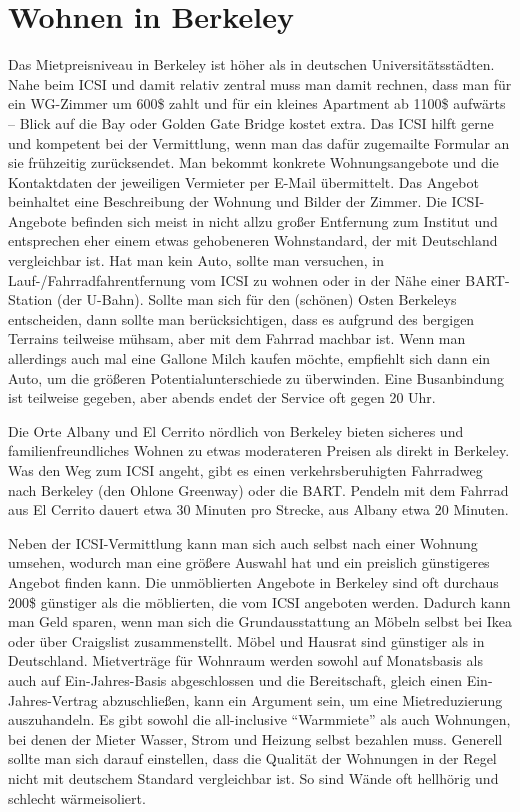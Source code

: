 \documentclass[a4paper]{scrreprt}
\begin{document}
\section{Wohnen in Berkeley}

Das Mietpreisniveau in Berkeley ist höher als in deutschen
Universitätsstädten. Nahe beim ICSI und damit relativ zentral muss man
damit rechnen, dass man für ein WG-Zimmer um 600\$ zahlt und für ein
kleines Apartment ab 1100\$ aufwärts -- Blick auf die Bay oder Golden
Gate Bridge kostet extra. Das ICSI hilft gerne und kompetent bei der
Vermittlung, wenn man das dafür zugemailte Formular an sie frühzeitig
zurücksendet. Man bekommt konkrete Wohnungsangebote und die
Kontaktdaten der jeweiligen Vermieter per E-Mail übermittelt. Das
Angebot beinhaltet eine Beschreibung der Wohnung und Bilder der
Zimmer. Die ICSI-Angebote befinden sich meist in nicht allzu großer
Entfernung zum Institut und entsprechen eher einem etwas gehobeneren
Wohnstandard, der mit Deutschland vergleichbar ist. Hat man kein Auto,
sollte man versuchen, in Lauf-/Fahrradfahrentfernung vom 
ICSI zu wohnen oder in der Nähe einer BART-Station (der
U-Bahn). Sollte man sich für den (schönen) Osten Berkeleys
entscheiden, dann sollte man berücksichtigen, dass es aufgrund des
bergigen Terrains teilweise mühsam, aber mit dem Fahrrad machbar
ist. Wenn man allerdings auch mal eine Gallone Milch kaufen möchte,
empfiehlt sich dann ein Auto, um die größeren Potentialunterschiede zu
überwinden. Eine Busanbindung ist teilweise gegeben, aber abends endet
der Service oft gegen 20 Uhr.

Die Orte Albany und El Cerrito nördlich von Berkeley bieten sicheres
und familienfreundliches Wohnen zu etwas moderateren Preisen als
direkt in Berkeley. Was den Weg zum ICSI angeht, gibt es einen
verkehrsberuhigten Fahrradweg nach Berkeley (den Ohlone Greenway) oder
die BART. Pendeln mit dem Fahrrad aus El Cerrito dauert etwa 30
Minuten pro Strecke, aus Albany etwa 20 Minuten.

Neben der ICSI-Vermittlung kann man sich auch selbst nach einer
Wohnung umsehen, wodurch man eine größere Auswahl hat und ein
preislich günstigeres Angebot finden kann. Die unmöblierten Angebote
in Berkeley sind oft durchaus 200\$ günstiger als die möblierten, die
vom ICSI angeboten werden. Dadurch kann man Geld sparen, wenn man sich
die Grundausstattung an Möbeln selbst bei Ikea oder über Craigslist
zusammenstellt. Möbel und Hausrat sind günstiger als in
Deutschland. Mietverträge für Wohnraum werden sowohl auf Monatsbasis
als auch auf Ein-Jahres-Basis abgeschlossen und die Bereitschaft,
gleich einen Ein-Jahres-Vertrag abzuschließen, kann ein Argument sein,
um eine Mietreduzierung auszuhandeln. Es gibt sowohl die all-inclusive
"`Warmmiete"' als auch Wohnungen, bei denen der Mieter Wasser, Strom
und Heizung selbst bezahlen muss. Generell sollte man sich darauf
einstellen, dass die Qualität der Wohnungen in der Regel nicht mit
deutschem Standard vergleichbar ist. So sind Wände oft hellhörig und
schlecht wärmeisoliert.
\end{document}
